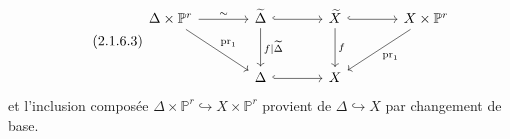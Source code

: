 \begin{equation}\tag{2.1.6.3}
\begin{tikzcd}[column sep=large, row sep=large]
\Delta \times \mathbb{P}^r \arrow[r, "\sim"] \arrow[dr, "\mathrm{pr}_1"] & \widetilde{\Delta} \arrow[r, hook] \arrow[d, "f|\widetilde{\Delta}"] & \widetilde{X} \arrow[r, hook] \arrow[d, "f"] & X \times \mathbb{P}^r \arrow[dl, "\mathrm{pr}_1"] \\
{} & \Delta \arrow[r, hook] & X &
{} \end{tikzcd}
\end{equation}
et l'inclusion composée $\Delta \times \mathbb{P}^r \hookrightarrow X \times \mathbb{P}^r$ provient de $\Delta \hookrightarrow X$ par changement de base.

